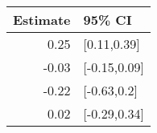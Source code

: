 \begin{tabular}{rl}
  \hline
Estimate & 95\% CI \\ 
  \hline
0.25 & [0.11,0.39] \\ 
  -0.03 & [-0.15,0.09] \\ 
  -0.22 & [-0.63,0.2] \\ 
  0.02 & [-0.29,0.34] \\ 
   \hline
\end{tabular}

